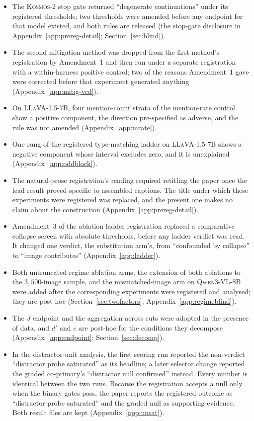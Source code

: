 \begin{itemize}
\itemsep0.2em
\item The \textsc{Kosmos-2} stop gate returned ``degenerate continuations'' under its
registered thresholds; two thresholds were amended before any endpoint for that model existed, and
both rules are released (the stop-gate disclosure in Appendix~\ref{app:prereg-detail}; Section~\ref{sec:blind}).
\item The second mitigation method was dropped from the first method's registration by
Amendment~1 and then run under a separate registration with a within-harness positive control; two
of the reasons Amendment~1 gave were corrected before that experiment generated anything
(Appendix~\ref{app:mitig-vcd}).
\item On \textsc{LLaVA-1.5-7B}, four mention-count strata of the mention-rate control show a
positive component, the direction pre-specified as adverse, and the rule was not amended
(Appendix~\ref{app:mrate}).
\item One rung of the registered type-matching ladder on \textsc{LLaVA-1.5-7B} shows a negative
component whose interval excludes zero, and it is unexplained (Appendix~\ref{app:oddblock}).
\item The natural-prose registration's reading required retitling the paper once the lead result
proved specific to assembled captions. The title under which these experiments were registered was
replaced, and the present one makes no claim about the construction (Appendix~\ref{app:prereg-detail}).
\item Amendment~3 of the ablation-ladder registration replaced a comparative collapse screen with
absolute thresholds, before any ladder verdict was read. It changed one verdict, the substitution
arm's, from ``confounded by collapse'' to ``image contributes'' (Appendix~\ref{app:ladder}).
\item Both untruncated-regime ablation arms, the extension of both ablations to the $3{,}500$-image
sample, and the mismatched-image arm on \textsc{Qwen3-VL-8B} were added after the corresponding experiments
were registered and analysed; they are post hoc
(Section~\ref{sec:twofactors}; Appendix~\ref{app:regimeblind}).
\item The $J$ endpoint and the aggregation across cuts were adopted in the presence of data, and
$d'$ and $c$ are post-hoc for the conditions they decompose (Appendix~\ref{app:endpoint};
Section~\ref{sec:decomp}).
\item In the distractor-unit analysis, the first scoring run reported the non-verdict
``distractor probe saturated'' as its headline; a later selector change reported the graded
co-primary's ``distractor null confirmed'' instead. Every number is identical between the two
runs. Because the registration accepts a null only when the binary gates pass, the paper reports the
registered outcome as ``distractor probe saturated'' and the graded null as supporting evidence. Both result
files are kept (Appendix~\ref{app:unsat}).
\end{itemize}


